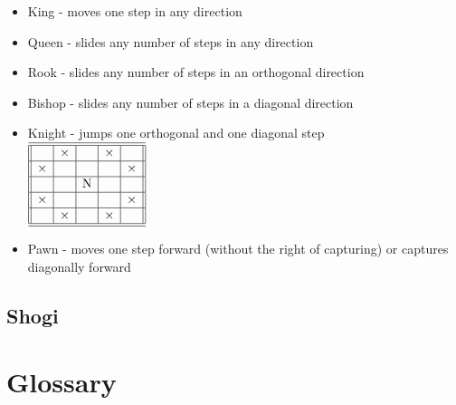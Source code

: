 \documentclass[10pt,dvipdfmx,letterpaper]{report}
\let\x=\times
\begin{document}
\begin{itemize}
\item King - moves one step in any direction \\
    \boardthreebythree{$\x$}{$\x$}{$\x$}{$\x$}{K}{$\x$}{$\x$}{$\x$}{$\x$}
\item Queen - slides any number of steps in any direction \\ 
\item Rook - slides any number of steps in an orthogonal direction \\ 
\item Bishop - slides any number of steps in a diagonal direction \\ 
\item Knight - jumps one orthogonal and one diagonal step \\ 
    $\begin{array}{||c|c|c|c|c||}\hline\hline
   & \x &          & \x &    \\\hline
\x &    &          &    & \x \\\hline
   &    & \text{N} &    &    \\\hline
\x &    &          &    & \x \\\hline
   & \x &          & \x &    \\\hline\hline
\end{array}$
\item Pawn - moves one step forward (without the right of capturing) or captures diagonally forward \\
\end{itemize}

\section{Shogi}

\chapter*{Glossary}

\newcommand{\gloss}[2]{\par{\bf{#1}} --- {#2}}
\end{document}
